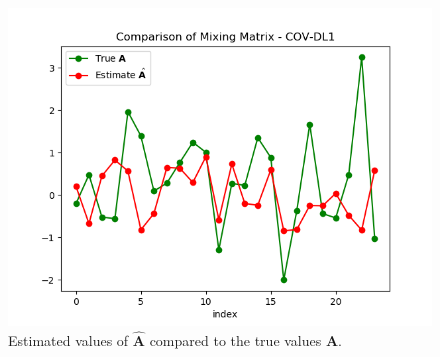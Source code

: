 \begin{figure}[H]
\centering
\includegraphics[scale=0.5]{figures/ch_6/COV1_simple.png}
\caption{Estimated values of $\hat{\mathbf{A}}$ compared to the true 				values $\mathbf{A}$.}
\label{fig:cov1_simple}
\end{figure}

